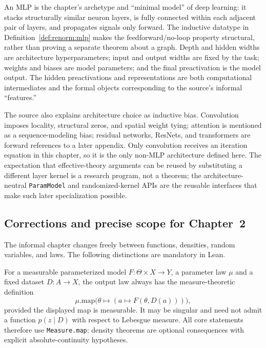 An MLP is the chapter's archetype and ``minimal model'' of deep learning: it stacks structurally
similar neuron layers, is fully connected within each adjacent pair of layers, and propagates
signals only forward.  The inductive datatype in Definition~\ref{def:renorm:mlp} makes the
feedforward/no-loop property structural, rather than proving a separate theorem about a graph.
Depth and hidden widths are architecture hyperparameters; input and output widths are fixed by the
task; weights and biases are model parameters; and the final preactivation is the model output.
The hidden preactivations and representations are both computational intermediates and the formal
objects corresponding to the source's informal ``features.''

The source also explains architecture choice as inductive bias.  Convolution imposes locality,
structural zeros, and spatial weight tying; attention is mentioned as a sequence-modeling bias;
residual networks, ResNets, and transformers are forward references to a later appendix.  Only
convolution receives an iteration equation in this chapter, so it is the only non-MLP architecture
defined here.  The expectation that effective-theory arguments can be reused by substituting a
different layer kernel is a research program, not a theorem; the architecture-neutral
\texttt{ParamModel} and randomized-kernel APIs are the reusable interfaces that make such later
specialization possible.

\subsection{Corrections and precise scope for Chapter~2}

The informal chapter changes freely between functions, densities, random variables, and laws.  The
following distinctions are mandatory in Lean.

\begin{remark}
For a measurable parameterized model $F:\Theta\times X\to Y$, a parameter law $\mu$ and a fixed
dataset $D:A\to X$, the output law always has the measure-theoretic definition
\[
  \mu\mathbin{.\mathrm{map}}\bigl(\theta\mapsto(a\mapsto F(\theta,D(a)))\bigr),
\]
provided the displayed map is measurable.  It may be singular and need not admit a function
$p(z\mid D)$ with respect to Lebesgue measure.  All core statements therefore use
\texttt{Measure.map}; density theorems are optional consequences with explicit absolute-continuity
hypotheses.
\end{remark}

